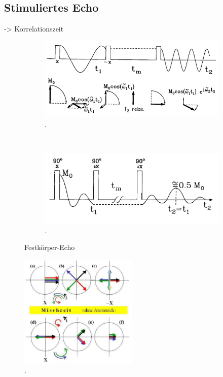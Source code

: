 \subsection{Stimuliertes Echo}
-> Korrelationszeit
\begin{figure}
\centering
	\begin{subfigure}[b]{0.4\textwidth}
		\includegraphics[width=\textwidth]{Plots/stimuliertesecho.png} 
		\caption{.}
		\label{.}
	\end{subfigure}
	~
	\begin{subfigure}[b]{0.4\textwidth}
		\includegraphics[width=\textwidth]{Plots/stimuliertesecho2.png}
		\caption{.}
		\label{.}
	\end{subfigure}
\caption{Festk\"{o}rper-Echo}
\label{.}
\end{figure}

\begin{figure}[hbtp]
	\centering
	\includegraphics[width=0.5\textwidth]{Plots/mischzeit.png}
	\caption{.}
	\label{.}
\end{figure}
